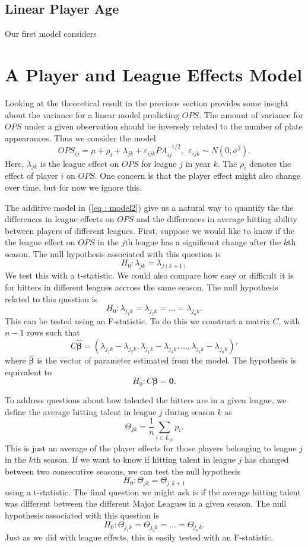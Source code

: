 \documentclass [52pt] {article}
\begin{document}
\subsection{Linear Player Age}
Our first model considers

\section{A Player and League Effects Model}\label{sec : att2}

Looking at the theoretical result in the previous section provides some insight about the variance for a linear model predicting $OPS$.  The amount of variance for $OPS$ under a given observation should be inversely related to the number of plate appearances.  Thus we consider the model
\begin{equation}\label{eq : model2}
OPS_{ij} = \mu+\rho_i+\lambda_{jk} +\varepsilon_{ijk}PA_{ij}^{-1/2}, \:\:\varepsilon_{ijk}\sim N(0, \sigma^2).
\end{equation}
Here, $\lambda_{jk}$ is the league effect on $OPS$ for league $j$ in year $k$.  The $\rho_i$ denotes the effect of player $i$ on $OPS$. One concern is that the player effect might also change over time, but for now we ignore this.  

The additive model in (\ref{eq : model2}) give us a natural way to quantify the the differences in league effects on $OPS$ and the differences in average hitting ability between players of different leagues.  First, suppose we would like to know if the the league effect on $OPS$ in the $j$th league has a significant change after the $k$th season.  The null hypothesis associated with this question is 
\[H_0: \lambda_{jk} = \lambda_{j(k+1)}\]
We test this with a t-statistic.  We could also compare how easy or difficult it is for hitters in different leagues accross the same season.  The null hypothesis related to this question is 
\[H_0: \lambda_{j_1k} = \lambda_{j_2k} = ...= \lambda_{j_nk}.\]
This can be tested using an F-statistic.  To do this we construct a matrix $C$, with $n - 1$ rows such that 
\[C\hat{\pmb{\beta}} = (\lambda_{j_1k}-\lambda_{j_2k},\lambda_{j_1k}-\lambda_{j_3k}, ..., \lambda_{j_1k}-\lambda_{j_nk})'\] 
where $\hat{\pmb{\beta}}$ is the vector of parameter estimated from the model.  The hypothesis is equivalent to 
\[H_0:C\pmb\beta = \mathbf{0}.\]

To address questions about how talented the hitters are in a given league, we define the average hitting talent in league $j$ during season $k$ as
\[\Theta_{jk} = \frac{1}{n}\sum_{i\in L_{jk}} p_i.\]
This is just an average of the player effects for those players belonging to league $j$ in the $k$th season.  If we want to know if hitting talent in league $j$ has changed between two consecutive seasons, we can test the null hypothesis
\[H_0: \Theta_{jk} = \Theta_{j,k+1}\]
using a t-statistic.  The final question we might ask is if the average hitting talent was different between the different Major Leagues in a given season.  The null hypothesis associated with this question is 
\[H_0: \Theta_{j_1k} = \Theta_{j_2k} = ...= \Theta_{j_nk}.\]
Just as we did with league effects, this is easily tested with an F-statistic. 
\end{document}

